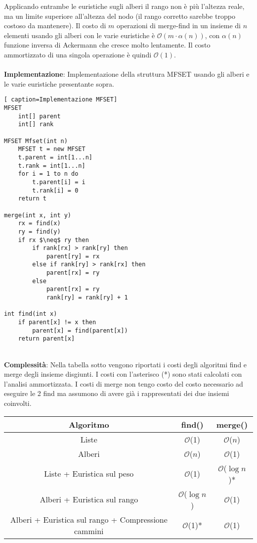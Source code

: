 \documentclass[../cheatSheetAlgoritmi.tex]{subfiles}
\begin{document}
Applicando entrambe le euristiche sugli alberi il rango non è più l'altezza reale, ma un limite superiore all'altezza del nodo (il rango corretto sarebbe troppo costoso da mantenere). Il costo di $m$ operazioni di merge-find in un insieme di $n$ elementi usando gli alberi con le varie euristiche è  $\mathcal{O}(m \cdot \alpha(n))$, con $\alpha(n)$ funzione inversa di Ackermann che cresce molto lentamente. Il costo ammortizzato di una singola operazione è quindi $\mathcal{O}(1)$. \\\\
\textbf{Implementazione}: Implementazione della struttura MFSET usando gli alberi e le varie euristiche presentante sopra.\
\begin{lstlisting}[ caption=Implementazione MFSET]
MFSET
	int[] parent
	int[] rank
	
MFSET Mfset(int n)
	MFSET t = new MFSET
	t.parent = int[1...n]
	t.rank = int[1...n]
	for i = 1 to n do
		t.parent[i] = i
		t.rank[i] = 0
	return t
	
merge(int x, int y)
	rx = find(x)
	ry = find(y)
	if rx $\neq$ ry then
		if rank[rx] > rank[ry] then
			parent[ry] = rx
		else if rank[ry] > rank[rx] then
			parent[rx] = ry
		else
			parent[rx] = ry
			rank[ry] = rank[ry] + 1

int find(int x)
	if parent[x] != x then
		parent[x] = find(parent[x])
	return parent[x]
\end{lstlisting}
\textbf{\\Complessità}: Nella tabella sotto vengono riportati i costi degli algoritmi find e merge degli insieme disgiunti. I costi con l'asterisco (*) sono stati calcolati con l'analisi ammortizzata. I costi di merge non tengo costo del costo necessario ad eseguire le 2 find ma assumono di avere già i rappresentati dei due insiemi coinvolti.\\
\begin{center}
	\renewcommand{\arraystretch}{1.2}
	\begin{tabular}{ |c|c|c| } 
		\hline
			\textbf{Algoritmo} & find() & merge()\\ 
		\hline
			Liste & $\mathcal{O}$(1) &  $\mathcal{O}$($n$)\\ 
		\hline
			Alberi &  $\mathcal{O}$($n$) &  $\mathcal{O}$(1) \\
		\hline
			Liste + Euristica sul peso & $\mathcal{O}$(1) &  $\mathcal{O}$($\log n$)*\\
		\hline
			Alberi + Euristica sul rango & $\mathcal{O}$($\log n$) &  $\mathcal{O}$(1)\\
		\hline
			Alberi + Euristica sul rango + Compressione cammini & $\mathcal{O}$(1)* &  $\mathcal{O}$(1)\\
		\hline
	\end{tabular}
\end{center}
\newpage
\end{document}
